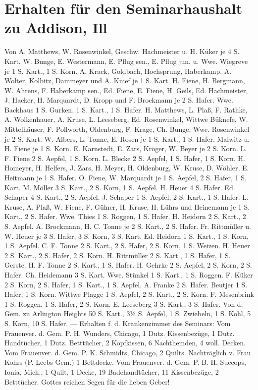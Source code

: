 \chapter[Erhalten für den Seminarhaushalt]{Erhalten für den Seminarhaushalt zu Addison, Ill}

Von A. Matthews, W. Rosenwinkel, Geschw. Hachmeister u. H. Küker je 4 S. Kart. W. Bunge, E. Westermann, E. Pflug sen., E. Pflug jun. u. Wwe. Wiegreve je 1 S. Kart., 1 S. Korn. A. Krack, Goldbach, Hochsprung, Haberkamp, A. Wolter, Kolbitz, Dammeyer und A. Knief je 1 S. Kart. H. Fiene, H. Bergmann, W. Ahrens, F. Haberkamp sen., Ed. Fiene, E. Fiene, H. Geils, Ed. Hachmeister, J. Hacker, H. Marquardt, D. Kropp und F. Brockmann je 2 S. Hafer. Wwe. Backhaus 1 S. Gurken, 1 S. Kart., 1 S. Hafer. H. Matthews, L. Plaß, F. Rathke, A. Wolkenhauer, A. Kruse, L. Leeseberg, Ed. Rosenwinkel, Wittwe Büknefe, W. Mittelhäuser, F. Pollworth, Oldenburg, F. Krage, Ch. Bunge, Wwe. Rosenwinkel je 2 S. Kart. W. Albers, L. Tonne, E. Rosen je 1 S. Kart., 1 S. Hafer. Malwitz u. H. Fiene je 1 S. Korn. E. Karnstedt, E. Zars, Kröger, W. Beyer je 2 S. Korn. L. F. Fiene 2 S. Aepfel, 1 S. Korn. L. Blecke 2 S. Aepfel, 1 S. Hafer, 1 S. Korn. H. Homeyer, H. Helfers, J. Zars, H. Meyer, H. Oldenburg, W. Kruse, D. Wöhler, E. Heitmann je 1 S. Hafer. O. Fiene, W. Marquardt je 1 S. Aepfel, 2 S. Hafer, 1 S. Kart. M. Möller 3 S. Kart., 2 S. Korn, 1 S. Aepfel. H. Heuer 4 S. Hafer. Ed. Schaper 4 S. Kart., 2 S. Aepfel. J. Schaper 1 S. Aepfel, 2 S. Kart., 1 S. Hafer. L. Kruse, A. Plaß, W. Fiene, F. Gülner, H. Kruse, H. Lührs und Heinemann je 1 S. Kart., 2 S. Hafer. Wwe. Thies 1 S. Roggen, 1 S. Hafer. H. Heidorn 2 S. Kart., 2 S. Aepfel. A. Brockmann, H. C. Tonne je 2 S. Kart., 2 S. Hafer. Fr. Rittmüller u. W. Heuer je 3 S. Hafer, 3 S. Korn, 3 S. Kart. Ed. Heidorn 1 S. Kart., 1 S. Korn, 1 S. Aepfel. C. F. Tonne 2 S. Kart., 2 S. Hafer, 2 S. Korn, 1 S. Weizen. H. Heuer 2 S. Kart., 2 S. Hafer, 2 S. Korn. H. Rittmüller 2 S. Kart., 1 S. Hafer, 1 S. Gerste. H. F. Tonne 2 S. Kart., 1 S. Hafer. H. Gehrke 2 S. Aepfel, 2 S. Korn, 2 S. Hafer. Ch. Heidemann 3 S. Kart. Wwe. Stünkel 1 S. Kart., 1 S. Roggen. F. Küker 2 S. Korn, 2 S. Hafer, 1 S. Kart., 1 S. Aepfel. A. Franke 2 S. Hafer. Beutjer 1 S. Hafer, 1 S. Korn. Wittwe Plagge 1 S. Aepfel, 2 S. Kart., 2 S. Korn. F. Mesenbrink 1 S. Roggen, 1 S. Hafer, 2 S. Korn. E. Leeseberg 3 S. Kart., 3 S. Hafer. Von d. Gem. zu Arlington Heights 50 S. Kart., 3½ S. Aepfel, 1 S. Zwiebeln, 1 S. Kohl, 5 S. Korn, 10 S. Hafer. — Erhalten f. d. Krankenzimmer des Seminars: Vom Frauenver. d. Gem. P. H. Wunders, Chicago, 1 Dutz. Kissenbezüge, 1 Dutz. Handtücher, 1 Dutz. Betttücher, 2 Kopfkissen, 6 Nachthemden, 4 woll. Decken. Vom Frauenver. d. Gem. P. K. Schmidts, Chicago, 2 Quilts. Nachträglich v. Frau Kohrs (P. Leebs Gem.) 1 Bettdecke. Vom Frauenver. d. Gem. P. B. H. Succops, Ionia, Mich., 1 Quilt, 1 Decke, 19 Badehandtücher, 11 Kissenbezüge, 2 Betttücher. Gottes reichen Segen für die lieben Geber!

